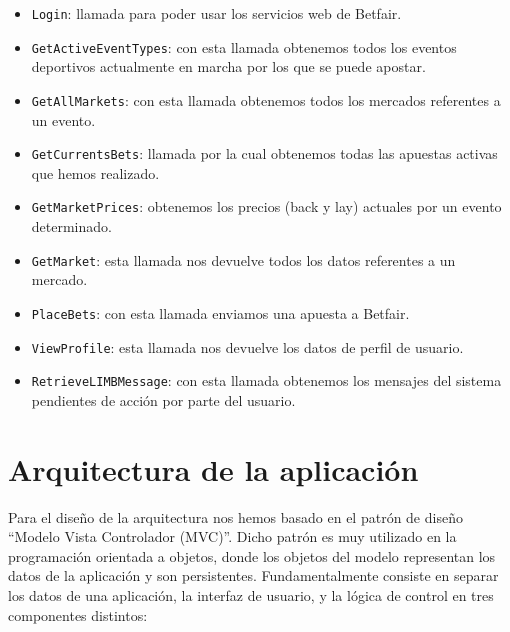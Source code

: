 \begin{itemize}
	\item \lstinline{Login}: 
		llamada para poder usar los servicios web de Betfair. 
	\item \lstinline{GetActiveEventTypes}: 
		con esta llamada obtenemos todos los eventos deportivos actualmente en marcha por los que se puede apostar.
	\item  \lstinline{GetAllMarkets}:
		con esta llamada obtenemos todos los mercados referentes a un evento.
	\item  \lstinline{GetCurrentsBets}:
		llamada por la cual obtenemos todas las apuestas activas que hemos realizado.
	\item  \lstinline{GetMarketPrices}:
		obtenemos los precios (back y lay) actuales por un evento determinado.
	\item  \lstinline{GetMarket}:
		esta llamada nos devuelve todos los datos referentes a un mercado.
	\item  \lstinline{PlaceBets}:
		con esta llamada enviamos una apuesta a Betfair.
	\item  \lstinline{ViewProfile}: 
		esta llamada nos devuelve los datos de perfil de usuario.
	\item  \lstinline{RetrieveLIMBMessage}:
		 con esta llamada obtenemos los mensajes del sistema pendientes de acción por parte del usuario.
\end{itemize}

\section{Arquitectura de la aplicación}


 Para el diseño de la arquitectura nos hemos basado en el patrón de diseño ``Modelo Vista Controlador (MVC)''. Dicho patrón es muy utilizado en la programación orientada a objetos, donde los objetos del modelo representan los datos de la aplicación y son persistentes. Fundamentalmente consiste en separar los datos de una aplicación, la interfaz de usuario, y la lógica de control en tres componentes distintos:
 
